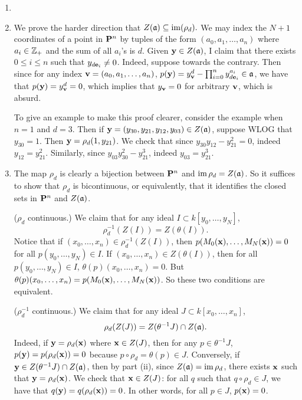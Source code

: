\documentclass[10pt]{amsart}
\begin{document}
\begin{solution}
        
\begin{enumerate}
    \item 
    \item We prove the harder direction that $Z(\mathfrak{a}) \subseteq \operatorname{im}(\rho_d).$ We may index the $N+1$ coordinates of a point in ${\bf P}^n$ by tuples of the form $(a_0, a_1, \dots, a_n)$ where $a_i \in \mathbb{Z}_{+}$ and the sum of all $a_i$'s is $d$. Given ${\bf y} \in Z(\mathfrak{a})$, I claim that there exists $0 \leq i \leq n$ such that $y_{d{\bf e}_i} \neq 0$. Indeed, suppose towards the contrary. Then since for any index ${\bf v} = (a_0, a_1, \dots, a_n)$, $p({\bf y}) = y_{{\bf v}}^d - \prod_{i = 0}^{n}y_{d {\bf e}_i}^{a_i} \in \mathfrak{a}$, we have that $p({\bf y}) = y_{{\bf v}}^d = 0$, which implies that $y_{{\bf v}} = 0$ for arbitrary ${\bf v}$, which is absurd. 

    To give an example to make this proof clearer, consider the example when $n = 1$ and $d = 3$. Then if ${\bf y} = (y_{30}, y_{21}, y_{12}, y_{03}) \in Z(\mathfrak{a})$, suppose WLOG that $y_{30} = 1$. Then ${\bf y} = \rho_d(1, y_{21})$. We check that since $y_{30}y_{12} - y_{21}^2 = 0$, indeed $y_{12} = y_{21}^2$. Similarly, since $y_{03}y_{30}^2 - y_{21}^3$, indeed $y_{03} = y_{21}^3$.

    \item The map $\rho_d$ is clearly a bijection between ${\bf P}^n$ and $\operatorname{im} \rho_d = Z(\mathfrak{a})$. So it suffices to show that $\rho_d$ is bicontinuous, or equivalently, that it identifies the closed sets in ${\bf P}^n$ and $Z(\mathfrak{a})$. 
        
    ($\rho_d$ continuous.) We claim that for any ideal $I \subset k[y_0, \dots, y_N]$, \[\rho_d^{-1}(Z(I)) = Z(\theta(I)).\] Notice that if $(x_0, \dots, x_n) \in \rho_d^{-1}(Z(I))$, then $p(M_0({\bf x}), \dots, M_N({\bf x})) = 0$ for all $p(y_0, \dots, y_N) \in I$. If $(x_0, \dots, x_n) \in Z(\theta(I))$, then for all $p(y_0, \dots, y_N) \in I$, $\theta(p)(x_0, \dots, x_n) = 0$. But $\theta(p)(x_0, \dots, x_n) = p(M_0({\bf x}), \dots, M_N({\bf x}))$. So these two conditions are equivalent.

    ($\rho_d^{-1}$ continuous.) We claim that for any ideal $J \subset k[x_0, \dots, x_n]$, \[\rho_d(Z(J)) = Z(\theta^{-1}J) \cap Z(\mathfrak{a}).\] Indeed, if ${\bf y} = \rho_d({\bf x})$ where ${\bf x} \in Z(J)$, then for any $p \in \theta^{-1}J$, $p({\bf y}) = p(\rho_d({\bf x})) = 0$ because $p \circ \rho_d = \theta(p) \in J$. Conversely, if ${\bf y} \in Z(\theta^{-1}J) \cap Z(\mathfrak{a})$, then by part (ii), since $Z(\mathfrak{a}) = \operatorname{im} \rho_d$, there exists ${\bf x}$ such that ${\bf y} = \rho_d({\bf x})$. We check that ${\bf x} \in Z(J)$: for all $q$ such that $q \circ \rho_d \in J$, we have that $q({\bf y}) = q(\rho_d({\bf x}))= 0$. In other words, for all $p \in J$, $p({\bf x}) = 0$.
\end{enumerate}
    


\end{solution}
\end{document}
